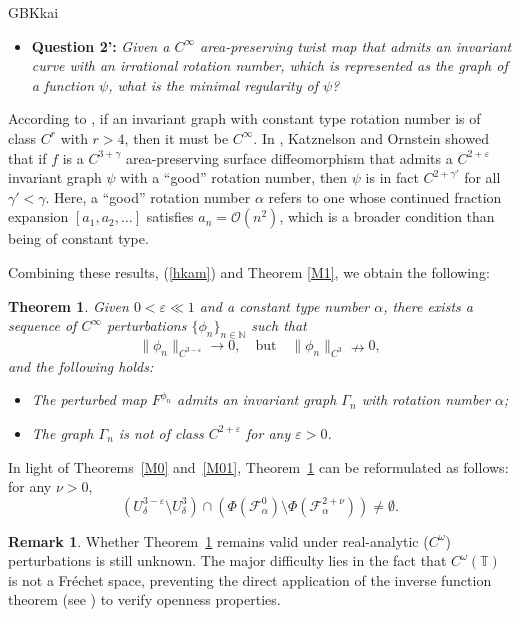 \documentclass{amsart}
\newtheorem{Theorem}{Theorem}
\theoremstyle{definition}
\newtheorem{Remark}[Definition]{Remark}
\begin{document}
\begin{CJK*}{GBK}{kai}
		\vspace{1ex}
		\begin{itemize}
			\item \textbf{Question 2':} \textit{Given a \( C^\infty \) area-preserving twist map that admits an invariant curve with an irrational rotation number, which is represented as the graph of a function \( \psi \), what is the {minimal regularity} of \( \psi \)?}
		\end{itemize}
		
		According to \cite{Sa}, if an invariant graph with constant type rotation number is of class \( C^r \) with \( r > 4 \), then it must be \( C^\infty \). In \cite{KO}, Katznelson and Ornstein showed that if \( f \) is a \( C^{3+\gamma} \) area-preserving surface diffeomorphism that admits a \( C^{2+\varepsilon} \) invariant graph \( \psi \) with a ``good'' rotation number, then \( \psi \) is in fact \( C^{2+\gamma'} \) for all \( \gamma' < \gamma \). Here, a ``good'' rotation number \( \alpha \) refers to one whose continued fraction expansion \( [a_1, a_2, \ldots] \) satisfies \( a_n = \mathcal{O}(n^2) \), which is a broader condition than being of constant type.
		
		Combining these results, (\ref{hkam}) and  Theorem \ref{M1}, we obtain the following:
		
		\begin{Theorem}\label{neev}
			Given \( 0 < \varepsilon \ll 1 \) and a constant type number \( \alpha \), there exists a sequence of \( C^\infty \) perturbations \( \{\phi_n\}_{n \in \mathbb{N}} \) such that
			\[
			\|\phi_n\|_{C^{3-\varepsilon}} \to 0, \quad \text{but} \quad \|\phi_n\|_{C^{3}} \nrightarrow 0,
			\]
			and the following holds:
			\begin{itemize}
				\item The perturbed map \( F^{\phi_n} \) admits an invariant graph \( {\Gamma}_n \) with rotation number \( \alpha \);
				\item The graph \( {\Gamma}_n \) is not of class \( C^{2+\varepsilon} \) for any \( \varepsilon > 0 \).
			\end{itemize}
		\end{Theorem}


\vspace{1ex}

		In light of Theorems~\ref{M0} and~\ref{M01}, Theorem~\ref{neev} can be reformulated as follows: for any $\nu > 0$,
\begin{equation}\label{t4re}
\left(U_\delta^{3 - \varepsilon} \setminus U_\delta^3\right) \cap \left(\Phi(\mathcal{F}_\alpha^{0}) \setminus \Phi(\mathcal{F}_\alpha^{2+\nu})\right) \neq \emptyset.
\end{equation}
		\begin{Remark}\label{rearre}
			Whether Theorem~\ref{neev} remains valid under real-analytic (\( C^\omega \)) perturbations is still unknown. The major difficulty lies in the fact that \( C^\omega(\mathbb{T}) \) is not a Fr\'{e}chet space, preventing the direct application of the inverse function theorem (see \cite[Theorem 2.6.1]{H1}) to verify openness properties.
		\end{Remark}
		

\end{CJK*}
\end{document}
